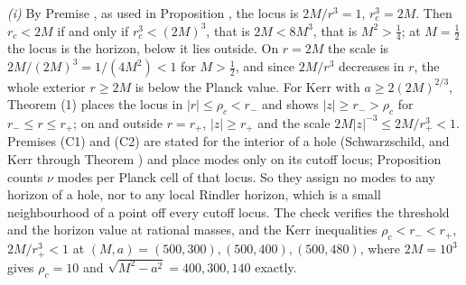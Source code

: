 \emph{(i)} By Premise , as used in Proposition , the locus is $2M/r^{3} = 1$, $r_{c}^{3} = 2M$. Then $r_{c} < 2M$ if and only if $r_{c}^{3} < (2M)^{3}$, that is $2M < 8M^{3}$, that is $M^{2} > \tfrac14$; at $M = \tfrac12$ the locus is the horizon, below it lies outside. On $r = 2M$ the scale is $2M/(2M)^{3} = 1/(4M^{2}) < 1$ for $M > \tfrac12$, and since $2M/r^{3}$ decreases in $r$, the whole exterior $r \ge 2M$ is below the Planck value. For Kerr with $a \ge 2(2M)^{2/3}$, Theorem (1) places the locus in $|r| \le \rho_{c} < r_{-}$ and shows $|z| \ge r_{-} > \rho_{c}$ for $r_{-} \le r \le r_{+}$; on and outside $r = r_{+}$, $|z| \ge r_{+}$ and the scale $2M|z|^{-3} \le 2M/r_{+}^{3} < 1$. Premises (C1) and (C2) are stated for the interior of a hole (Schwarzschild, and Kerr through Theorem ) and place modes only on its cutoff locus; Proposition  counts $\nu$ modes per Planck cell of that locus. So they assign no modes to any horizon of a hole, nor to any local Rindler horizon, which is a small neighbourhood of a point off every cutoff locus. The check verifies the threshold and the horizon value at rational masses, and the Kerr inequalities $\rho_{c} < r_{-} < r_{+}$, $2M/r_{+}^{3} < 1$ at $(M, a) = (500, 300), (500, 400), (500, 480)$, where $2M = 10^{3}$ gives $\rho_{c} = 10$ and $\sqrt{M^{2} - a^{2}} = 400, 300, 140$ exactly.

